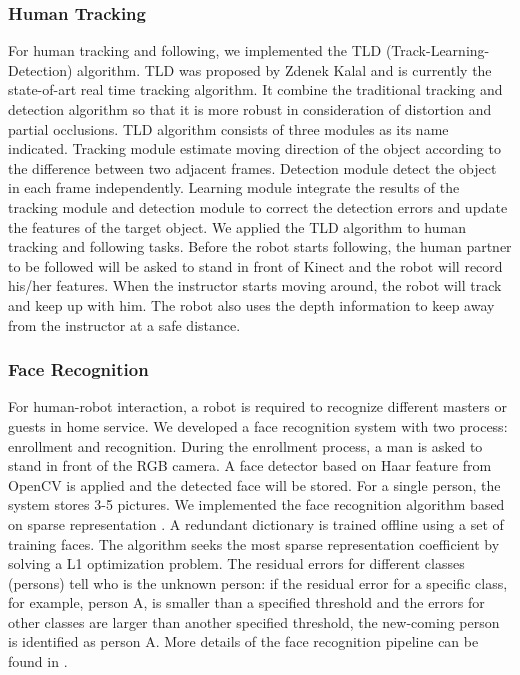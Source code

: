 \subsubsection{Human Tracking}
For human tracking and following, we implemented the TLD (Track-Learning-Detection) algorithm\cite{kalal2012tracking}. TLD was proposed by Zdenek Kalal and is currently the state-of-art real time tracking algorithm. It combine the traditional tracking and detection algorithm so that it is more robust in consideration of distortion and partial occlusions. TLD algorithm consists of three modules as its name indicated. Tracking module estimate moving direction of the object according to the difference between two adjacent frames. Detection module detect the object in each frame independently. Learning module integrate the results of the tracking module and detection module to correct the detection errors and update the features of the target object.
We applied the TLD algorithm to human tracking and following tasks. Before the robot starts following, the human partner to be followed will be asked to stand in front of Kinect and the robot will record his/her features. When the instructor starts moving around, the robot will track and keep up with him. The robot also uses the depth information to keep away from the instructor at a safe distance.
\subsubsection{Face Recognition}
For human-robot interaction, a robot is required to recognize different masters or guests in home service. We developed a face recognition system with two process: enrollment and recognition. During the enrollment process, a man is asked to stand in front of the RGB camera. A face detector based on Haar feature from OpenCV is applied and the detected face will be stored. For a single person, the system stores 3-5 pictures.
We implemented the face recognition algorithm based on sparse representation \cite{wright2009robust}. A redundant dictionary is trained offline using a set of training faces. The algorithm seeks the most sparse representation coefficient by solving a L1 optimization problem. The residual errors for different classes (persons) tell who is the unknown person: if the residual error for a specific class, for example, person A, is smaller than a specified threshold and the errors for other classes are larger than another specified threshold, the new-coming person is identified as person A. More details of the face recognition pipeline can be found in \cite{xia2015human}.
